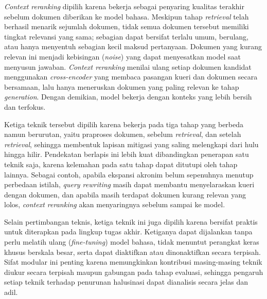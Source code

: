 \textit{Context reranking} dipilih karena bekerja sebagai penyaring kualitas terakhir sebelum dokumen diberikan ke model bahasa. Meskipun tahap \textit{retrieval} telah berhasil menarik sejumlah dokumen, tidak semua dokumen tersebut memiliki tingkat relevansi yang sama; sebagian dapat bersifat terlalu umum, berulang, atau hanya menyentuh sebagian kecil maksud pertanyaan. Dokumen yang kurang relevan ini menjadi kebisingan (\textit{noise}) yang dapat menyesatkan model saat menyusun jawaban. \textit{Context reranking} menilai ulang setiap dokumen kandidat menggunakan \textit{cross-encoder} yang membaca pasangan kueri dan dokumen secara bersamaan, lalu hanya meneruskan dokumen yang paling relevan ke tahap \textit{generation}. Dengan demikian, model bekerja dengan konteks yang lebih bersih dan terfokus.

Ketiga teknik tersebut dipilih karena bekerja pada tiga tahap yang berbeda namun berurutan, yaitu praproses dokumen, sebelum \textit{retrieval}, dan setelah \textit{retrieval}, sehingga membentuk lapisan mitigasi yang saling melengkapi dari hulu hingga hilir. Pendekatan berlapis ini lebih kuat dibandingkan penerapan satu teknik saja, karena kelemahan pada satu tahap dapat ditutupi oleh tahap lainnya. Sebagai contoh, apabila ekspansi akronim belum sepenuhnya menutup perbedaan istilah, \textit{query rewriting} masih dapat membantu menyelaraskan kueri dengan dokumen, dan apabila masih terdapat dokumen kurang relevan yang lolos, \textit{context reranking} akan menyaringnya sebelum sampai ke model. 

Selain pertimbangan teknis, ketiga teknik ini juga dipilih karena bersifat praktis untuk diterapkan pada lingkup tugas akhir. Ketiganya dapat dijalankan tanpa perlu melatih ulang (\textit{fine-tuning}) model bahasa, tidak menuntut perangkat keras khusus berskala besar, serta dapat diaktifkan atau dinonaktifkan secara terpisah. Sifat modular ini penting karena memungkinkan kontribusi masing-masing teknik diukur secara terpisah maupun gabungan pada tahap evaluasi, sehingga pengaruh setiap teknik terhadap penurunan halusinasi dapat dianalisis secara jelas dan adil.
